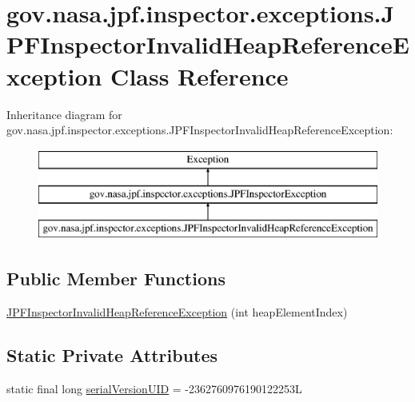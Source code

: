 \hypertarget{classgov_1_1nasa_1_1jpf_1_1inspector_1_1exceptions_1_1_j_p_f_inspector_invalid_heap_reference_exception}{}\section{gov.\+nasa.\+jpf.\+inspector.\+exceptions.\+J\+P\+F\+Inspector\+Invalid\+Heap\+Reference\+Exception Class Reference}
\label{classgov_1_1nasa_1_1jpf_1_1inspector_1_1exceptions_1_1_j_p_f_inspector_invalid_heap_reference_exception}
Inheritance diagram for gov.\+nasa.\+jpf.\+inspector.\+exceptions.\+J\+P\+F\+Inspector\+Invalid\+Heap\+Reference\+Exception\+:\begin{figure}[H]
\begin{center}
\leavevmode
\includegraphics[height=3.000000cm]{classgov_1_1nasa_1_1jpf_1_1inspector_1_1exceptions_1_1_j_p_f_inspector_invalid_heap_reference_exception}
\end{center}
\end{figure}
\subsection*{Public Member Functions}
\begin{DoxyCompactItemize}
\item 
\hyperlink{classgov_1_1nasa_1_1jpf_1_1inspector_1_1exceptions_1_1_j_p_f_inspector_invalid_heap_reference_exception_a81815936834021fd1e5755607baaaea2}{J\+P\+F\+Inspector\+Invalid\+Heap\+Reference\+Exception} (int heap\+Element\+Index)
\end{DoxyCompactItemize}
\subsection*{Static Private Attributes}
\begin{DoxyCompactItemize}
\item 
static final long \hyperlink{classgov_1_1nasa_1_1jpf_1_1inspector_1_1exceptions_1_1_j_p_f_inspector_invalid_heap_reference_exception_a08fcd1f7bedf37373248664fd85b7e97}{serial\+Version\+U\+ID} = -\/2362760976190122253L
\end{DoxyCompactItemize}


